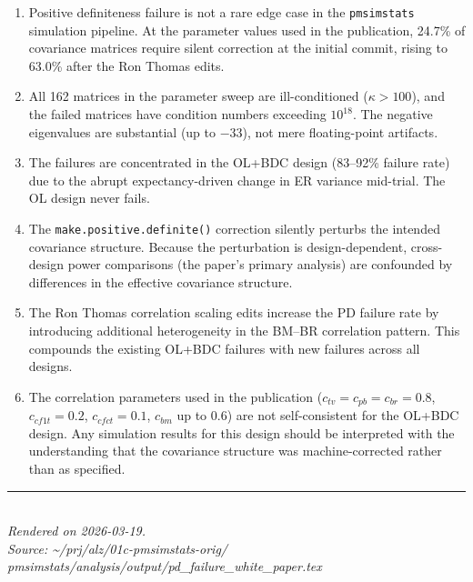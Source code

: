 \documentclass[11pt]{article}
\begin{document}
\begin{enumerate}
\item Positive definiteness failure is not a rare edge case in
  the \texttt{pmsimstats} simulation pipeline. At the parameter
  values used in the publication, 24.7\% of covariance matrices
  require silent correction at the initial commit, rising to
  63.0\% after the Ron Thomas edits.

\item All 162 matrices in the parameter sweep are
  ill-conditioned ($\kappa > 100$), and the failed matrices
  have condition numbers exceeding $10^{18}$. The negative
  eigenvalues are substantial (up to $-33$), not mere
  floating-point artifacts.

\item The failures are concentrated in the OL+BDC design
  (83--92\% failure rate) due to the abrupt expectancy-driven
  change in ER variance mid-trial. The OL design never fails.

\item The \texttt{make.positive.definite()} correction silently
  perturbs the intended covariance structure. Because the
  perturbation is design-dependent, cross-design power
  comparisons (the paper's primary analysis) are confounded
  by differences in the effective covariance structure.

\item The Ron Thomas correlation scaling edits increase the
  PD failure rate by introducing additional heterogeneity in
  the BM--BR correlation pattern. This compounds the existing
  OL+BDC failures with new failures across all designs.

\item The correlation parameters used in the publication
  ($c_{tv} = c_{pb} = c_{br} = 0.8$, $c_{cf1t} = 0.2$,
  $c_{cfct} = 0.1$, $c_{bm}$ up to 0.6) are not
  self-consistent for the OL+BDC design. Any simulation
  results for this design should be interpreted with the
  understanding that the covariance structure was
  machine-corrected rather than as specified.
\end{enumerate}

\vfill
\noindent\rule{\textwidth}{0.4pt}\\
{\small\textit{Rendered on 2026-03-19.}\\
\textit{Source: \textasciitilde/prj/alz/01c-pmsimstats-orig/%
pmsimstats/analysis/output/pd\_failure\_white\_paper.tex}}
\end{document}
